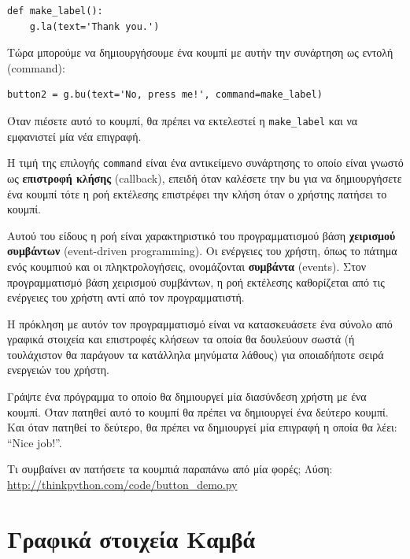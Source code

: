 \documentclass[10pt]{book}
\begin{document}
\begin{verbatim}
def make_label():
    g.la(text='Thank you.')
\end{verbatim}
%
Τώρα μπορούμε να δημιουργήσουμε ένα κουμπί με αυτήν την συνάρτηση ως εντολή  
(command):

\begin{verbatim}
button2 = g.bu(text='No, press me!', command=make_label)
\end{verbatim}
%
Όταν πιέσετε αυτό το κουμπί, θα πρέπει να εκτελεστεί η \verb"make_label"  
και να εμφανιστεί μία νέα επιγραφή.

Η τιμή της επιλογής {\tt command} είναι ένα αντικείμενο συνάρτησης το οποίο
είναι γνωστό ως {\bf επιστροφή κλήσης} (callback), επειδή όταν καλέσετε την {\tt bu} για να
δημιουργήσετε ένα κουμπί τότε η ροή εκτέλεσης επιστρέφει την κλήση όταν ο χρήστης πατήσει το κουμπί.

Αυτού του είδους η ροή είναι χαρακτηριστικό του προγραμματισμού βάση {\bf χειρισμού συμβάντων}
(event-driven programming). Οι ενέργειες του χρήστη, όπως το πάτημα ενός κουμπιού και οι πληκτρολογήσεις,
ονομάζονται {\bf συμβάντα} (events).  Στον προγραμματισμό βάση χειρισμού συμβάντων, η ροή εκτέλεσης
καθορίζεται από τις ενέργειες του χρήστη αντί από τον προγραμματιστή.

Η πρόκληση με αυτόν τον προγραμματισμό είναι να κατασκευάσετε ένα σύνολο από γραφικά 
στοιχεία και επιστροφές κλήσεων τα οποία θα δουλεύουν σωστά (ή τουλάχιστον θα παράγουν 
τα κατάλληλα μηνύματα λάθους) για οποιαδήποτε σειρά ενεργειών του χρήστη.
\\

\begin{exercise}

Γράψτε ένα πρόγραμμα το οποίο θα δημιουργεί μία διασύνδεση χρήστη με ένα κουμπί.  
Όταν πατηθεί αυτό το κουμπί θα πρέπει να δημιουργεί ένα δεύτερο κουμπί.  Και όταν 
πατηθεί το δεύτερο, θα πρέπει να δημιουργεί μία επιγραφή η οποία θα λέει: ``Nice job!''.

Τι συμβαίνει αν πατήσετε τα κουμπιά παραπάνω από μία φορές; 
Λύση: \url{http://thinkpython.com/code/button_demo.py}
\end{exercise}


 
\section{Γραφικά στοιχεία Καμβά}
\end{document}
